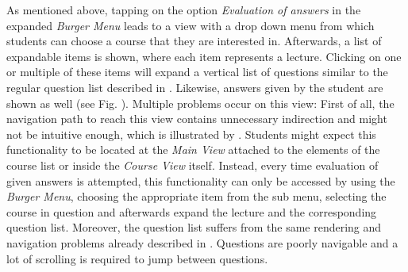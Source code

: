 As mentioned above, tapping on the option \emph{Evaluation of answers} in the expanded \emph{Burger Menu} leads to a view with a drop down menu from which students can choose a course that they are interested in. Afterwards, a list of expandable items is shown, where each item represents a lecture. Clicking on one or multiple of these items will expand a vertical list of questions similar to the regular question list described in . Likewise, answers given by the student are shown as well (see Fig. \todogrf).
Multiple problems occur on this view: First of all, the navigation path to reach this view contains unnecessary indirection and might not be intuitive enough, which is illustrated by . Students might expect this functionality to be located at the \emph{Main View} attached to the elements of the course list or inside the \emph{Course View} itself. Instead, every time evaluation of given answers is attempted, this functionality can only be accessed by using the \emph{Burger Menu}, choosing the appropriate item from the sub menu, selecting the course in question and afterwards expand the lecture and the corresponding question list.
Moreover, the question list suffers from the same rendering and navigation problems already described in . Questions are poorly navigable and a lot of scrolling is required to jump between questions.


